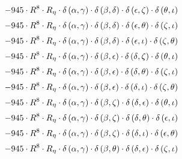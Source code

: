 \begin{subequations}
\begin{gather}
 \\[0.2em] \notag 		 - 945 \cdot R^{8} \cdot R_{\eta{}} \cdot \delta{}\left(\alpha{}, \gamma{}\right) \cdot \delta{}\left(\beta{}, \delta{}\right) \cdot \delta{}\left(\epsilon{}, \zeta{}\right) \cdot \delta{}\left(\theta{}, \iota{}\right) 
 \\[0.2em] \notag 		 - 945 \cdot R^{8} \cdot R_{\eta{}} \cdot \delta{}\left(\alpha{}, \gamma{}\right) \cdot \delta{}\left(\beta{}, \delta{}\right) \cdot \delta{}\left(\epsilon{}, \theta{}\right) \cdot \delta{}\left(\zeta{}, \iota{}\right) 
 \\[0.2em] \notag 		 - 945 \cdot R^{8} \cdot R_{\eta{}} \cdot \delta{}\left(\alpha{}, \gamma{}\right) \cdot \delta{}\left(\beta{}, \delta{}\right) \cdot \delta{}\left(\epsilon{}, \iota{}\right) \cdot \delta{}\left(\zeta{}, \theta{}\right) 
 \\[0.2em] \notag 		 - 945 \cdot R^{8} \cdot R_{\eta{}} \cdot \delta{}\left(\alpha{}, \gamma{}\right) \cdot \delta{}\left(\beta{}, \epsilon{}\right) \cdot \delta{}\left(\delta{}, \zeta{}\right) \cdot \delta{}\left(\theta{}, \iota{}\right) 
 \\[0.2em] \notag 		 - 945 \cdot R^{8} \cdot R_{\eta{}} \cdot \delta{}\left(\alpha{}, \gamma{}\right) \cdot \delta{}\left(\beta{}, \epsilon{}\right) \cdot \delta{}\left(\delta{}, \theta{}\right) \cdot \delta{}\left(\zeta{}, \iota{}\right) 
 \\[0.2em] \notag 		 - 945 \cdot R^{8} \cdot R_{\eta{}} \cdot \delta{}\left(\alpha{}, \gamma{}\right) \cdot \delta{}\left(\beta{}, \epsilon{}\right) \cdot \delta{}\left(\delta{}, \iota{}\right) \cdot \delta{}\left(\zeta{}, \theta{}\right) 
 \\[0.2em] \notag 		 - 945 \cdot R^{8} \cdot R_{\eta{}} \cdot \delta{}\left(\alpha{}, \gamma{}\right) \cdot \delta{}\left(\beta{}, \zeta{}\right) \cdot \delta{}\left(\delta{}, \epsilon{}\right) \cdot \delta{}\left(\theta{}, \iota{}\right) 
 \\[0.2em] \notag 		 - 945 \cdot R^{8} \cdot R_{\eta{}} \cdot \delta{}\left(\alpha{}, \gamma{}\right) \cdot \delta{}\left(\beta{}, \zeta{}\right) \cdot \delta{}\left(\delta{}, \theta{}\right) \cdot \delta{}\left(\epsilon{}, \iota{}\right) 
 \\[0.2em] \notag 		 - 945 \cdot R^{8} \cdot R_{\eta{}} \cdot \delta{}\left(\alpha{}, \gamma{}\right) \cdot \delta{}\left(\beta{}, \zeta{}\right) \cdot \delta{}\left(\delta{}, \iota{}\right) \cdot \delta{}\left(\epsilon{}, \theta{}\right) 
 \\[0.2em] \notag 		 - 945 \cdot R^{8} \cdot R_{\eta{}} \cdot \delta{}\left(\alpha{}, \gamma{}\right) \cdot \delta{}\left(\beta{}, \theta{}\right) \cdot \delta{}\left(\delta{}, \epsilon{}\right) \cdot \delta{}\left(\zeta{}, \iota{}\right) 

\end{gather}
\end{subequations}
